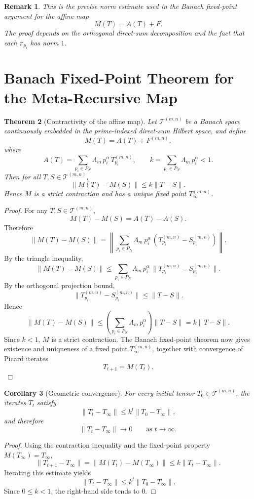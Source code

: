 \documentclass[11pt,a4paper]{article}
\newtheorem{theorem}{Theorem}[section]
\newtheorem{corollary}[theorem]{Corollary}
\newtheorem{remark}[theorem]{Remark}
\begin{document}
\begin{remark}
This is the precise norm estimate used in the Banach fixed-point argument for the affine map
\[
M(T)=A(T)+F.
\]
The proof depends on the orthogonal direct-sum decomposition and the fact that each \(\pi_{p_i}\) has norm \(1\).
\end{remark}

\section{Banach Fixed-Point Theorem for the Meta-Recursive Map}

\begin{theorem}[Contractivity of the affine map]
Let \(\mathcal{T}^{(m,n)}\) be a Banach space continuously embedded in the prime-indexed direct-sum Hilbert space, and define
\[
M(T)=A(T)+F^{(m,n)},
\]
where
\[
A(T)=\sum_{p_i\in P_N}\Lambda_m\, p_i^\alpha\, T_{p_i}^{(m,n)},
\qquad
k=\sum_{p_i\in P_N}\Lambda_m\, p_i^\alpha<1.
\]
Then for all \(T,S\in\mathcal{T}^{(m,n)}\),
\[
\|M(T)-M(S)\| \le k\|T-S\|.
\]
Hence \(M\) is a strict contraction and has a unique fixed point \(T_\infty^{(m,n)}\).
\end{theorem}

\begin{proof}
For any \(T,S\in \mathcal{T}^{(m,n)}\),
\[
M(T)-M(S)=A(T)-A(S).
\]
Therefore
\[
\|M(T)-M(S)\|
=
\left\|
\sum_{p_i\in P_N}\Lambda_m\, p_i^\alpha\, (T_{p_i}^{(m,n)}-S_{p_i}^{(m,n)})
\right\|.
\]
By the triangle inequality,
\[
\|M(T)-M(S)\|
\le
\sum_{p_i\in P_N}\Lambda_m\, p_i^\alpha\, \|T_{p_i}^{(m,n)}-S_{p_i}^{(m,n)}\|.
\]
By the orthogonal projection bound,
\[
\|T_{p_i}^{(m,n)}-S_{p_i}^{(m,n)}\|
\le
\|T-S\|.
\]
Hence
\[
\|M(T)-M(S)\|
\le
\left(\sum_{p_i\in P_N}\Lambda_m\, p_i^\alpha\right)\|T-S\|
=
k\|T-S\|.
\]
Since \(k<1\), \(M\) is a strict contraction. The Banach fixed-point theorem now gives existence and uniqueness of a fixed point \(T_\infty^{(m,n)}\), together with convergence of Picard iterates
\[
T_{t+1}=M(T_t).
\]
\end{proof}

\begin{corollary}[Geometric convergence]
For every initial tensor \(T_0\in\mathcal{T}^{(m,n)}\), the iterates \(T_t\) satisfy
\[
\|T_t-T_\infty\| \le k^t \|T_0-T_\infty\|,
\]
and therefore
\[
\|T_t-T_\infty\| \to 0
\qquad \text{as } t\to\infty.
\]
\end{corollary}

\begin{proof}
Using the contraction inequality and the fixed-point property \(M(T_\infty)=T_\infty\),
\[
\|T_{t+1}-T_\infty\|
=
\|M(T_t)-M(T_\infty)\|
\le
k\|T_t-T_\infty\|.
\]
Iterating this estimate yields
\[
\|T_t-T_\infty\|
\le
k^t\|T_0-T_\infty\|.
\]
Since \(0\le k<1\), the right-hand side tends to \(0\).
\end{proof}
\end{document}
